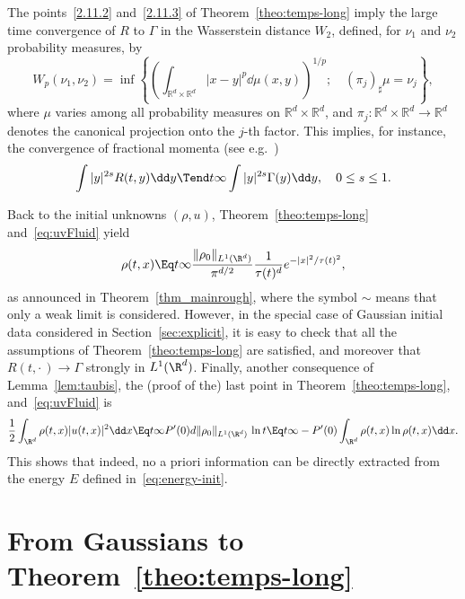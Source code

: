 \begin{rema}
The points~\eqref{2.11.2} and~\eqref{2.11.3} of Theorem~\ref{theo:temps-long} imply the large time convergence of $R$ to $\Gamma$ in the Wasserstein distance $W_2$, defined, for $\nu_1$ and $\nu_2$ probability measures, by
\begin{equation*}
W_p(\nu_1,\nu_2)=\inf \left\{ \left(\int_{{\mathbb R}^d\times {\mathbb R}^d}|x-y|^p\dd \mu(x,y)\right)^{1/p};\quad (\pi_j)_\sharp
\mu=\nu_j\right\},
\end{equation*}
where $\mu$ varies among all probability measures on ${\mathbb R}^d\times {\mathbb R}^d$, and $\pi_j:{\mathbb R}^d\times {\mathbb R}^d\to {\mathbb R}^d$ denotes the canonical projection onto the $j$-th factor. This implies, for instance, the convergence of fractional momenta (see e.g.~\cite[Theorem~7.12]{Vi03})
\begin{equation}\label{eq:moment-int}
\int |y|^{2s}R(t,y) \dd y\Tend t \infty \int |y|^{2s}\Gamma(y)\dd y,\quad 0\le s\le 1.
\end{equation}
\end{rema}

Back to the initial unknowns $(\rho,u)$, Theorem~\ref{theo:temps-long} and~\eqref{eq:uvFluid} yield
\begin{equation*}
\rho(t,x)\Eq t \infty
\frac{\|\rho_0\|_{L^1(\R^d)}}{\pi^{d/2}}\frac{1}{\tau(t)^d}e^{-|x|^2/\tau(t)^2},
\end{equation*}
as announced in Theorem~\ref{thm_mainrough}, where the symbol $\sim$ means that only a weak limit is considered. However, in the special case of Gaussian initial data considered in Section~\ref{sec:explicit}, it is easy to check that all the assumptions of Theorem~\ref{theo:temps-long} are satisfied, and moreover that $R(t,\cdot\,)\to \Gamma$ strongly in $L^1(\R^d)$. Finally, another consequence of Lemma~\ref{lem:taubis}, the (proof of the) last point in Theorem~\ref{theo:temps-long}, and~\eqref{eq:uvFluid} is
\begin{equation*}
\frac{1}{2}\int_{\R^d}\rho(t,x) |u(t,x)|^2 \dd x\Eq t \infty P'(0)d\|\rho_0\|_{L^1(\R^d)} \, \ln t \Eq t
\infty -P'(0)\int_{\R^d} \rho(t,x)\ln \rho(t,x)\dd x.
\end{equation*}
This shows that indeed, no a priori information can be directly extracted from the energy $E$ defined in~\eqref{eq:energy-init}.


\section{From Gaussians to Theorem~\ref{theo:temps-long}}\label{sec:longtime}

